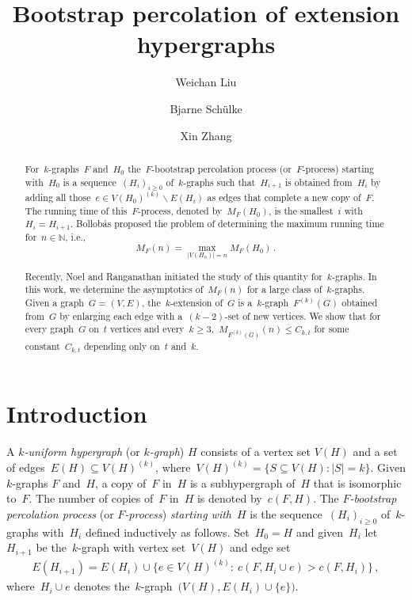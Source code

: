 \documentclass[oneside, 12pt]{amsart}
\numberwithin{equation}{section}
\numberwithin{figure}{section}
\let\setminus=\smallsetminus
\theoremstyle{plain}
\theoremstyle{note}
\theoremstyle{remark}
\begin{document}
	
	\title[Bootstrap percolation of extension hypergraphs]{Bootstrap percolation of extension hypergraphs}
	
	\author[Weichan Liu]{Weichan Liu}
	\address{School of Mathematics, Shandong University, Jinan, China}
	
	\author[Bjarne Sch\"{u}lke]{Bjarne Sch\"{u}lke}
	\address{Extremal Combinatorics and Probability Group, Institute for Basic Science, Daejeon, South Korea}
	
	\author[Xin Zhang]{Xin Zhang}
	\address{School of Mathematics and Statistics, Xidian University, Xi'an, China}
	
	
	\begin{abstract}
        For~$k$-graphs~$F$ and~$H_0$ the~$F$-bootstrap percolation process (or~$F$-process) starting with~$H_0$ is a sequence~$(H_i)_{i\geq0}$ of~$k$-graphs such that~$H_{i+1}$ is obtained from~$H_i$ by adding all those~$e\in V(H_0)^{(k)}\setminus E(H_i)$ as edges that complete a new copy of~$F$.
        The running time of this~$F$-process, denoted by~$M_F(H_0)$, is the smallest~$i$ with~$H_i=H_{i+1}$.
        Bollob\'as proposed the problem of determining the maximum running time for~$n\in\mathds{N}$, i.e., $$M_F(n)=\max_{\vert V(H_0)\vert=n}M_F(H_0)\,.$$
        
        Recently, Noel and Ranganathan initiated the study of this quantity for~$k$-graphs.
        In this work, we determine the asymptotics of~$M_F(n)$ for a large class of~$k$-graphs.
	    Given a graph~$G=(V,E)$, the~$k$-extension of~$G$ is a~$k$-graph~$F^{(k)}(G)$ obtained from~$G$ by enlarging each edge with a~$(k-2)$-set of new vertices.
        We show that for every graph~$G$ on~$t$ vertices and every~$k\geq 3$,~$M_{F^{(k)}(G)}(n)\leq C_{k,t}$ for some constant~$C_{k,t}$ depending only on~$t$ and~$k$.
	\end{abstract}
	
	\maketitle
	\section{Introduction}
	
	A \emph{$k$-uniform hypergraph} (or \emph{$k$-graph}) $H$ consists of a vertex set $V(H)$ and a set of edges~$E(H) \subseteq V(H)^{(k)}$, where~$V(H)^{(k)} = \{ S \subseteq V(H) : |S| = k \}$.
	Given $k$-graphs $F$ and~$H$, a copy of~$F$ in~$H$ is a subhypergraph of~$H$ that is isomorphic to~$F$.
    The number of copies of~$F$ in~$H$ is denoted by~$c(F,H)$.
    The \emph{$F$-bootstrap percolation process} (or \emph{$F$-process}) \emph{starting with}~$H$ is the sequence~$(H_i)_{i\geq0}$ of~$k$-graphs with~$H_i$ defined inductively as follows.
    Set~$H_0=H$ and given~$H_i$ let~$H_{i+1}$ be the~$k$-graph with vertex set~$V(H)$ and edge set
    \begin{align*}
		E(H_{i+1})=E(H_i)\cup\big\{e\in V(H)^{(k)}:\: c(F,H_i\cup e)>c(F,H_i)\big\}\,,
	\end{align*}
    where~$H_i\cup e$ denotes the~$k$-graph~$\big(V(H),E(H_i)\cup\{e\}\big)$.
\end{document}
